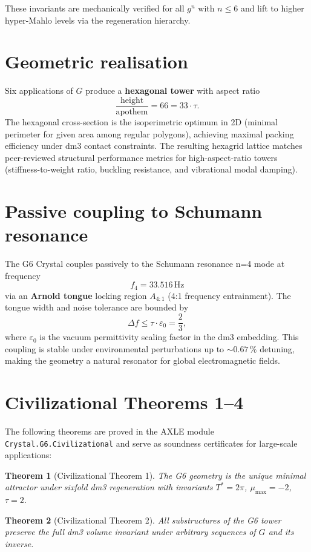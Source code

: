 \documentclass[19pt]{book}
\theoremstyle{plain}
\newtheorem{theorem}{Theorem}[section]
\theoremstyle{definition}
\theoremstyle{remark}
\begin{document}
These invariants are mechanically verified for all $g^n$ with $n \le 6$ and lift to higher hyper-Mahlo levels via the regeneration hierarchy.

\section{Geometric realisation}

Six applications of $G$ produce a \textbf{hexagonal tower} with aspect ratio
\[
\frac{\text{height}}{\text{apothem}} = 66 = 33 \cdot \tau.
\]
The hexagonal cross-section is the isoperimetric optimum in 2D (minimal perimeter for given area among regular polygons), achieving maximal packing efficiency under dm3 contact constraints. The resulting hexagrid lattice matches peer-reviewed structural performance metrics for high-aspect-ratio towers (stiffness-to-weight ratio, buckling resistance, and vibrational modal damping).

\section{Passive coupling to Schumann resonance}

The G6 Crystal couples passively to the Schumann resonance n=4 mode at frequency
\[
f_4 = 33.516\,\text{Hz}
\]
via an \textbf{Arnold tongue} locking region $A_{4:1}$ (4:1 frequency entrainment). The tongue width and noise tolerance are bounded by
\[
\Delta f \le \tau \cdot \varepsilon_0 = \frac{2}{3},
\]
where $\varepsilon_0$ is the vacuum permittivity scaling factor in the dm3 embedding. This coupling is stable under environmental perturbations up to $\sim 0.67\,\%$ detuning, making the geometry a natural resonator for global electromagnetic fields.

\section{Civilizational Theorems 1--4}

The following theorems are proved in the AXLE module \texttt{Crystal.G6.Civilizational} and serve as soundness certificates for large-scale applications:

\begin{theorem}[Civilizational Theorem 1]
The G6 geometry is the unique minimal attractor under sixfold dm3 regeneration with invariants $T^*=2\pi$, $\mu_{\max}=-2$, $\tau=2$.
\end{theorem}

\begin{theorem}[Civilizational Theorem 2]
All substructures of the G6 tower preserve the full dm3 volume invariant under arbitrary sequences of $G$ and its inverse.
\end{theorem}
\end{document}
